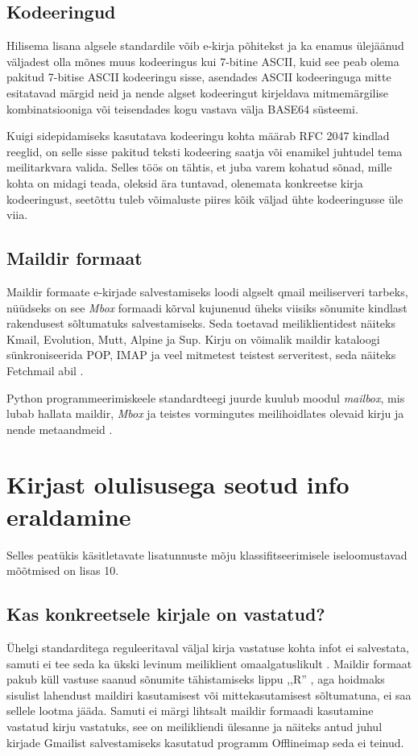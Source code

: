 \documentclass[]{trkuur}
\let\eng\emph
\let\enp\eng
\begin{document}
\section{Kodeeringud}
Hilisema lisana algsele standardile võib e-kirja põhitekst ja ka enamus
ülejäänud väljadest olla mõnes muus kodeeringus kui 7-bitine ASCII, kuid see
peab olema pakitud 7-bitise ASCII kodeeringu sisse, asendades ASCII kodeeringuga
mitte esitatavad märgid neid ja nende algset kodeeringut kirjeldava
mitmemärgilise kombinatsiooniga või teisendades kogu vastava välja BASE64
süsteemi. \autocite{rfc2047}
\autocite{wiki-unicode-and-email}

Kuigi sidepidamiseks kasutatava kodeeringu kohta määrab RFC 2047 kindlad
reeglid, on selle sisse pakitud teksti kodeering saatja või enamikel juhtudel
tema meilitarkvara valida. Selles töös on tähtis, et juba varem kohatud sõnad,
mille kohta on midagi teada, oleksid ära tuntavad, olenemata konkreetse kirja
kodeeringust, seetõttu tuleb võimaluste piires kõik väljad ühte kodeeringusse
üle viia.

\section{Maildir formaat}
Maildir formaate e-kirjade salvestamiseks loodi algselt qmail meiliserveri
tarbeks, nüüdseks on see \eng{Mbox} formaadi kõrval kujunenud üheks viisiks sõnumite
kindlast rakendusest sõltumatuks salvestamiseks. Seda toetavad meiliklientidest
näiteks Kmail,
Evolution, Mutt, Alpine ja Sup.
\autocite{wiki-maildir}
Kirju on võimalik maildir kataloogi sünkroniseerida POP, IMAP ja veel mitmetest
teistest serveritest, seda näiteks Fetchmail abil \autocite{fetchmail}.

Python programmeerimiskeele standardteegi juurde kuulub moodul \enp{mailbox},
mis lubab hallata maildir, \eng{Mbox} ja teistes vormingutes meilihoidlates olevaid
kirju ja nende metaandmeid \autocite{pymailboxdoc}.

\chapter{Kirjast olulisusega seotud info eraldamine}
Selles peatükis käsitletavate lisatunnuste mõju klassifitseerimisele iseloomustavad
mõõtmised on lisas 10.
\section{Kas konkreetsele kirjale on vastatud?}
Ühelgi standarditega reguleeritaval väljal kirja vastatuse kohta infot ei
salvestata, samuti ei tee seda ka ükski levinum meiliklient omaalgatuslikult
\autocite{KorpelaMailHeaderRef}.
Maildir formaat pakub küll vastuse saanud sõnumite tähistamiseks
lippu ,,R'' \autocite{maildir},
aga hoidmaks sisulist lahendust maildiri kasutamisest või
mittekasutamisest sõltumatuna, ei saa sellele lootma jääda.
Samuti ei märgi lihtsalt maildir formaadi kasutamine vastatud kirju
vastatuks, see on meilikliendi ülesanne ja näiteks antud juhul kirjade
Gmailist salvestamiseks kasutatud programm Offlineimap seda ei teinud.
\end{document}
